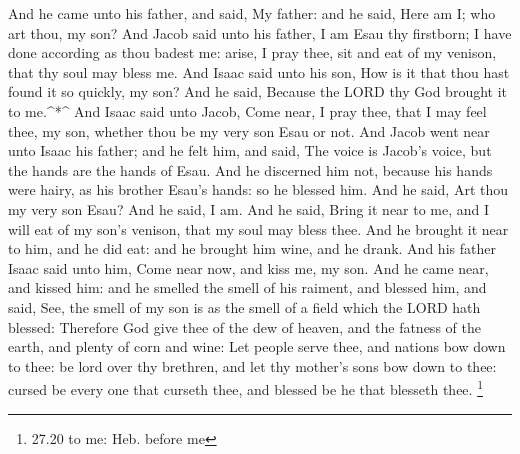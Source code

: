  And he came unto his father, and said, My father: and he
said, Here am I; who art thou, my son?  And Jacob said unto
his father, I am Esau thy firstborn; I have done according as thou
badest me: arise, I pray thee, sit and eat of my venison, that thy soul
may bless me.  And Isaac said unto his son, How is it that
thou hast found it so quickly, my son? And he said, Because the LORD thy
God brought it to me.\^{}*\^{}  And Isaac said unto Jacob,
Come near, I pray thee, that I may feel thee, my son, whether thou be my
very son Esau or not.  And Jacob went near unto Isaac his
father; and he felt him, and said, The voice is Jacob's voice, but the
hands are the hands of Esau.  And he discerned him not,
because his hands were hairy, as his brother Esau's hands: so he blessed
him.  And he said, Art thou my very son Esau? And he said,
I am.  And he said, Bring it near to me, and I will eat of
my son's venison, that my soul may bless thee. And he brought it near to
him, and he did eat: and he brought him wine, and he drank.
 And his father Isaac said unto him, Come near now, and
kiss me, my son.  And he came near, and kissed him: and he
smelled the smell of his raiment, and blessed him, and said, See, the
smell of my son is as the smell of a field which the LORD hath blessed:
 Therefore God give thee of the dew of heaven, and the
fatness of the earth, and plenty of corn and wine:  Let
people serve thee, and nations bow down to thee: be lord over thy
brethren, and let thy mother's sons bow down to thee: cursed be every
one that curseth thee, and blessed be he that blesseth thee. \footnote{27.20
  to me: Heb. before me}

